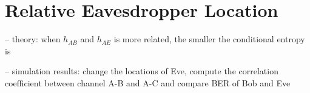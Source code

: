 \section{Relative Eavesdropper Location}
-- theory: when $h_{AB}$ and $h_{AE}$ is more related, the smaller the conditional entropy is

-- simulation results: change the locations of Eve, compute the correlation coefficient between channel A-B and A-C and compare BER of Bob and Eve